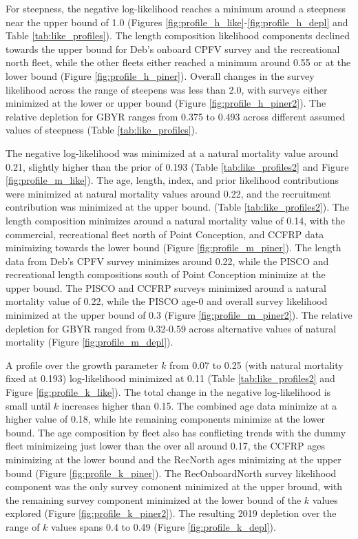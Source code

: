 \documentclass[12pt,]{article}
\begin{document}
For steepness, the negative log-likelihood reaches a minimum around a
steepness near the upper bound of 1.0 (Figures
\ref{fig:profile_h_like}-\ref{fig:profile_h_depl} and Table
\ref{tab:like_profiles}). The length composition likelihood components
declined towards the upper bound for Deb's onboard CPFV survey and the
recreational north fleet, while the other fleets either reached a
minimum around 0.55 or at the lower bound (Figure
\ref{fig:profile_h_piner}). Overall changes in the survey likelihood
across the range of steepens was less than 2.0, with surveys either
minimized at the lower or upper bound (Figure
\ref{fig:profile_h_piner2}). The relative depletion for GBYR ranges from
0.375 to 0.493 across different assumed values of steepness (Table
\ref{tab:like_profiles}).

The negative log-likelihood was minimized at a natural mortality value
around 0.21, slightly higher than the prior of 0.193 (Table
\ref{tab:like_profiles2} and Figure \ref{fig:profile_m_like}). The age,
length, index, and prior likelihood contributions were minimized at
natural mortality values around 0.22, and the recruitment contribution
was minimized at the upper bound. (Table \ref{tab:like_profiles2}). The
length composition minimizes around a natural mortality value of 0.14,
with the commercial, recreational fleet north of Point Conception, and
CCFRP data minimizing towards the lower bound (Figure
\ref{fig:profile_m_piner}). The length data from Deb's CPFV survey
minimizes around 0.22, while the PISCO and recreational length
compositions south of Point Conception minimize at the upper bound. The
PISCO and CCFRP surveys minimized around a natural mortality value of
0.22, while the PISCO age-0 and overall survey likelihood minimized at
the upper bound of 0.3 (Figure \ref{fig:profile_m_piner2}). The relative
depletion for GBYR ranged from 0.32-0.59 across alternative values of
natural mortality (Figure \ref{fig:profile_m_depl}).

A profile over the growth parameter \(k\) from 0.07 to 0.25 (with
natural mortality fixed at 0.193) log-likelihood minimized at 0.11
(Table \ref{tab:like_profiles2} and Figure \ref{fig:profile_k_like}).
The total change in the negative log-likelihood is small until \(k\)
increases higher than 0.15. The combined age data minimize at a higher
value of 0.18, while hte remaining components minimize at the lower
bound. The age composition by fleet also has conflicting trends with the
dummy fleet minimizeing just lower than the over all around 0.17, the
CCFRP ages minimizing at the lower bound and the RecNorth ages
minimizing at the upper bound (Figure \ref{fig:profile_k_piner}). The
RecOnboardNorth survey likelihood component was the only survey comonent
minimized at the upper bround, with the remaining survey component
minimized at the lower bound of the \(k\) values explored (Figure
\ref{fig:profile_k_piner2}). The resulting 2019 depletion over the range
of \(k\) values spans 0.4 to 0.49 (Figure \ref{fig:profile_k_depl}).
\end{document}
